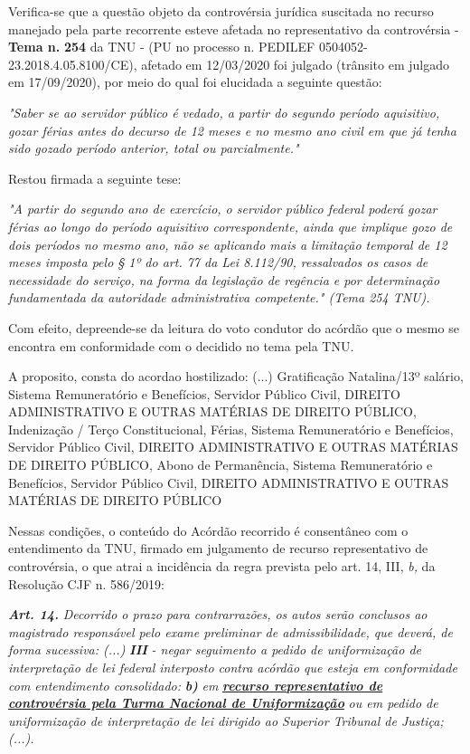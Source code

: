 \documentclass[12pt]{article}
\begin{document}
\justifying
\noindent Verifica-se que a questão objeto da controvérsia jurídica suscitada no recurso manejado pela parte recorrente esteve afetada no representativo da controvérsia - \textbf{Tema n. }\textbf{254} da TNU - (PU no processo n. PEDILEF 0504052-23.2018.4.05.8100/CE),  afetado em 12/03/2020 foi julgado (trânsito em julgado em 17/09/2020), por meio do qual foi elucidada a seguinte questão:

\noindent \textit{"Saber se ao servidor público é vedado, a partir do segundo período aquisitivo, gozar férias antes do decurso de 12 meses e no mesmo ano civil em que já tenha sido gozado período anterior, total ou parcialmente."}

\noindent Restou firmada a seguinte tese:

\noindent \textit{"A partir do segundo ano de exercício, o servidor público federal poderá gozar férias ao longo do período aquisitivo correspondente, ainda que implique gozo de dois períodos no mesmo ano, não se aplicando mais a limitação temporal de 12 meses imposta pelo § 1º do art. 77 da Lei 8.112/90, ressalvados os casos de necessidade do serviço, na forma da legislação de regência e por determinação fundamentada da autoridade administrativa competente." (Tema 254 TNU).}

\noindent Com efeito, depreende-se da leitura do voto condutor do acórdão que o mesmo se encontra em conformidade com o decidido no  tema pela TNU.

\noindent A proposito, consta do acordao hostilizado: (...) Gratificação Natalina/13º salário, Sistema Remuneratório e Benefícios, Servidor Público Civil, DIREITO ADMINISTRATIVO E OUTRAS MATÉRIAS DE DIREITO PÚBLICO, Indenização / Terço Constitucional, Férias, Sistema Remuneratório e Benefícios, Servidor Público Civil, DIREITO ADMINISTRATIVO E OUTRAS MATÉRIAS DE DIREITO PÚBLICO, Abono de Permanência, Sistema Remuneratório e Benefícios, Servidor Público Civil, DIREITO ADMINISTRATIVO E OUTRAS MATÉRIAS DE DIREITO PÚBLICO

\noindent Nessas condições, o conteúdo do Acórdão recorrido é consentâneo com o entendimento da TNU, firmado em julgamento de recurso representativo de controvérsia, o que atrai a incidência da regra prevista pelo art. 14, III, \textit{b,} da Resolução CJF n. 586/2019:

\noindent \textit{\textbf{Art. 14.}}\textit{ Decorrido o prazo para contrarrazões, os autos serão conclusos ao magistrado responsável pelo exame preliminar de admissibilidade, que deverá, de forma sucessiva: (...) }\textit{\textbf{III }}\textit{- negar seguimento a pedido de uniformização de interpretação de lei federal interposto contra acórdão que esteja em conformidade com entendimento consolidado: }\textit{\textbf{b)}}\textit{ em }\uline{\textit{\textbf{recurso representativo de controvérsia pela Turma Nacional de Uniformização}}}\textit{ ou em pedido de uniformização de interpretação de lei dirigido ao Superior Tribunal de Justiça;(...).}
\end{document}

